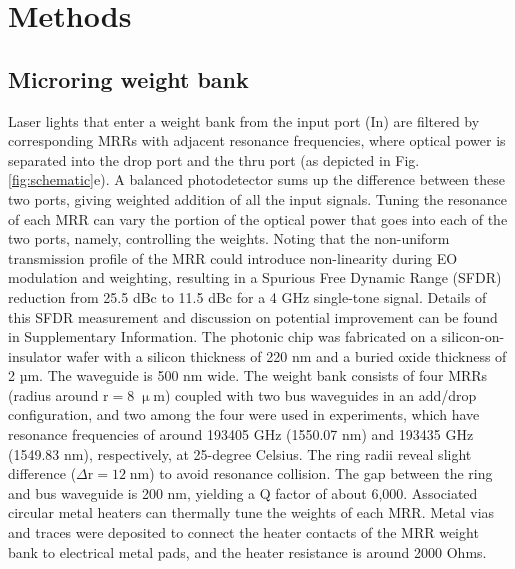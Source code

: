 \documentclass[pdflatex,mathphys]{sty}%
\begin{document}
\section{Methods}
\subsection{Microring weight bank}
Laser lights that enter a weight bank from the input port (In) are filtered by corresponding MRRs with adjacent resonance frequencies, where optical power is separated into the drop port and the thru port (as depicted in Fig. \ref{fig:schematic}e). A balanced photodetector sums up the difference between these two ports, giving weighted addition of all the input signals. Tuning the resonance of each MRR can vary the portion of the optical power that goes into each of the two ports, namely, controlling the weights. Noting that the non-uniform transmission profile of the MRR could introduce non-linearity during  EO modulation and weighting, resulting in a Spurious Free Dynamic Range (SFDR) reduction from 25.5 dBc to 11.5 dBc for a 4 GHz single-tone signal. Details of this SFDR measurement and discussion on potential improvement can be found in Supplementary Information. The photonic chip was fabricated on a silicon-on-insulator wafer with a silicon thickness of 220 nm and a buried oxide thickness of 2 µm. The waveguide is 500 nm wide. The weight bank consists of four MRRs (radius around $\textrm{r}=8\;\upmu\textrm{m}$) coupled with two bus waveguides in an add/drop configuration, and two among the four were used in experiments, which have resonance frequencies of around 193405 GHz (1550.07 nm) and 193435 GHz (1549.83 nm), respectively, at 25-degree Celsius. The ring radii reveal slight difference ($\Delta\textrm{r}=12\;\textrm{nm}$) to avoid resonance collision. The gap between the ring and bus waveguide is 200 nm, yielding a Q factor of about 6,000. Associated circular metal heaters can thermally tune the weights of each MRR. Metal vias and traces were deposited to connect the heater contacts of the MRR weight bank to electrical metal pads, and the heater resistance is around 2000 Ohms.

\end{document}
